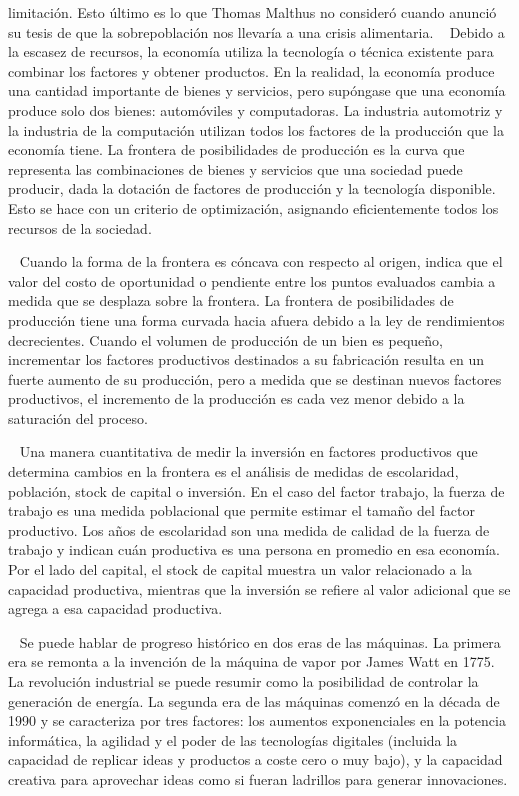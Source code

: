 \documentclass[
  letterpaper,
  DIV=11,
  numbers=noendperiod]{scrreport}
\begin{document}
limitación. Esto último es lo que Thomas Malthus no consideró cuando
anunció su tesis de que la sobrepoblación nos llevaría a una crisis
alimentaria. ~ Debido a la escasez de recursos, la economía utiliza la
tecnología o técnica existente para combinar los factores y obtener
productos. En la realidad, la economía produce una cantidad importante
de bienes y servicios, pero supóngase que una economía produce solo dos
bienes: automóviles y computadoras. La industria automotriz y la
industria de la computación utilizan todos los factores de la producción
que la economía tiene. La frontera de posibilidades de producción es la
curva que representa las combinaciones de bienes y servicios que una
sociedad puede producir, dada la dotación de factores de producción y la
tecnología disponible. Esto se hace con un criterio de optimización,
asignando eficientemente todos los recursos de la sociedad.

~ Cuando la forma de la frontera es cóncava con respecto al origen,
indica que el valor del costo de oportunidad o pendiente entre los
puntos evaluados cambia a medida que se desplaza sobre la frontera. La
frontera de posibilidades de producción tiene una forma curvada hacia
afuera debido a la ley de rendimientos decrecientes. Cuando el volumen
de producción de un bien es pequeño, incrementar los factores
productivos destinados a su fabricación resulta en un fuerte aumento de
su producción, pero a medida que se destinan nuevos factores
productivos, el incremento de la producción es cada vez menor debido a
la saturación del proceso.

~ Una manera cuantitativa de medir la inversión en factores productivos
que determina cambios en la frontera es el análisis de medidas de
escolaridad, población, stock de capital o inversión. En el caso del
factor trabajo, la fuerza de trabajo es una medida poblacional que
permite estimar el tamaño del factor productivo. Los años de escolaridad
son una medida de calidad de la fuerza de trabajo y indican cuán
productiva es una persona en promedio en esa economía. Por el lado del
capital, el stock de capital muestra un valor relacionado a la capacidad
productiva, mientras que la inversión se refiere al valor adicional que
se agrega a esa capacidad productiva.

~ Se puede hablar de progreso histórico en dos eras de las máquinas. La
primera era se remonta a la invención de la máquina de vapor por James
Watt en 1775. La revolución industrial se puede resumir como la
posibilidad de controlar la generación de energía. La segunda era de las
máquinas comenzó en la década de 1990 y se caracteriza por tres
factores: los aumentos exponenciales en la potencia informática, la
agilidad y el poder de las tecnologías digitales (incluida la capacidad
de replicar ideas y productos a coste cero o muy bajo), y la capacidad
creativa para aprovechar ideas como si fueran ladrillos para generar
innovaciones.
\end{document}
